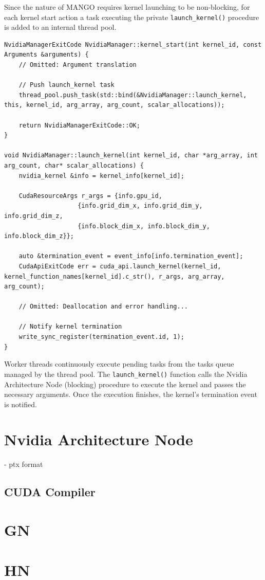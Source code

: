 Since the nature of MANGO requires kernel launching to be non-blocking, for each kernel start action a task executing the private \texttt{launch\_kernel()} procedure is added to an internal thread pool.

\begin{lstlisting}[style=CStyle, caption=HHAL Nvidia Manager - Kernel launch]
NvidiaManagerExitCode NvidiaManager::kernel_start(int kernel_id, const Arguments &arguments) {
    // Omitted: Argument translation

    // Push launch_kernel task
    thread_pool.push_task(std::bind(&NvidiaManager::launch_kernel, this, kernel_id, arg_array, arg_count, scalar_allocations));

    return NvidiaManagerExitCode::OK;
}

void NvidiaManager::launch_kernel(int kernel_id, char *arg_array, int arg_count, char* scalar_allocations) {
    nvidia_kernel &info = kernel_info[kernel_id];

    CudaResourceArgs r_args = {info.gpu_id, 
                    {info.grid_dim_x, info.grid_dim_y, info.grid_dim_z, 
                    {info.block_dim_x, info.block_dim_y, info.block_dim_z}};

    auto &termination_event = event_info[info.termination_event];
    CudaApiExitCode err = cuda_api.launch_kernel(kernel_id, kernel_function_names[kernel_id].c_str(), r_args, arg_array, arg_count);

    // Omitted: Deallocation and error handling...

    // Notify kernel termination
    write_sync_register(termination_event.id, 1); 
}
\end{lstlisting}

Worker threads continuously execute pending tasks from the tasks queue managed by the thread pool. 
The \texttt{launch\_kernel()} function calls the Nvidia Architecture Node (blocking) procedure to execute the kernel and passes the necessary arguments.
Once the execution finishes, the kernel's termination event is notified.

\section{Nvidia Architecture Node} \label{NvidiaArchitectureNode}

- ptx format 

\subsection{CUDA Compiler} \label{Nvidia:CudaCompiler}


\section{GN}

\section{HN}